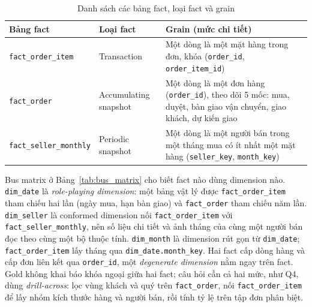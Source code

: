 \documentclass[a4paper]{article}
\begin{document}
\begin{table}[htbp]
\centering
\footnotesize
\caption{Danh sách các bảng fact, loại fact và grain}
\label{tab:fact_tables}
\begin{tabularx}{\textwidth}{@{}>{\raggedright\arraybackslash}p{3.2cm}>{\raggedright\arraybackslash}p{3.0cm}>{\raggedright\arraybackslash}X@{}}
\toprule
\textbf{Bảng fact} & \textbf{Loại fact} & \textbf{Grain (mức chi tiết)} \\
\midrule
\texttt{fact\_order\_item} & Transaction & Một dòng là một mặt hàng trong đơn, khóa (\texttt{order\_id}, \texttt{order\_item\_id}) \\
\addlinespace
\texttt{fact\_order} & Accumulating snapshot & Một dòng là một đơn hàng (\texttt{order\_id}), theo dõi 5 mốc: mua, duyệt, bàn giao vận chuyển, giao khách, dự kiến giao \\
\addlinespace
\texttt{fact\_seller\_monthly} & Periodic snapshot & Một dòng là một người bán trong một tháng mua có ít nhất một mặt hàng (\texttt{seller\_key}, \texttt{month\_key}) \\
\bottomrule
\end{tabularx}
\end{table}

Bus matrix ở Bảng~\ref{tab:bus_matrix} cho biết fact nào dùng dimension nào. \texttt{dim\_date} là \textit{role-playing dimension}: một bảng vật lý được \texttt{fact\_order\_item} tham chiếu hai lần (ngày mua, hạn bàn giao) và \texttt{fact\_order} tham chiếu năm lần. \texttt{dim\_seller} là conformed dimension nối \texttt{fact\_order\_item} với \texttt{fact\_seller\_monthly}, nên số liệu chi tiết và ảnh tháng của cùng một người bán đọc theo cùng một bộ thuộc tính. \texttt{dim\_month} là dimension rút gọn từ \texttt{dim\_date}; \texttt{fact\_order\_item} lấy tháng qua \texttt{dim\_date.month\_key}. Hai fact cấp dòng hàng và cấp đơn liên kết qua \texttt{order\_id}, một \textit{degenerate dimension} nằm ngay trên fact. Gold không khai báo khóa ngoại giữa hai fact; câu hỏi cần cả hai mức, như Q4, dùng \textit{drill-across}: lọc vùng khách và quý trên \texttt{fact\_order}, nối \texttt{fact\_order\_item} để lấy nhóm kích thước hàng và người bán, rồi tính tỷ lệ trên tập đơn phân biệt.
\end{document}
